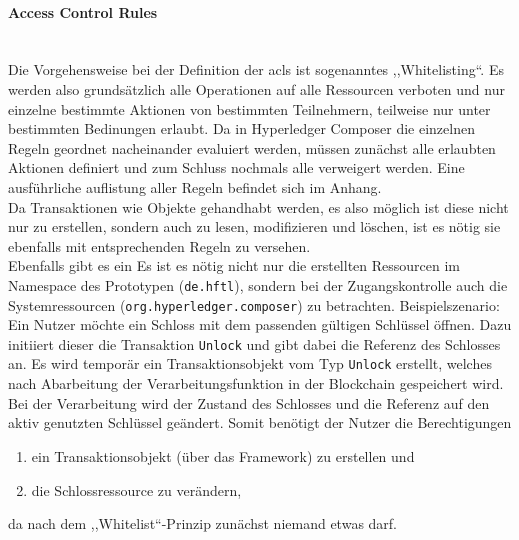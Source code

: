         \paragraph{\textrm{Access Control Rules}}\hspace{0cm}\\
            Die Vorgehensweise bei der Definition der \gls{acl}s ist sogenanntes ,,Whitelisting``. 
            Es werden also grundsätzlich alle Operationen auf alle Ressourcen verboten und nur einzelne bestimmte Aktionen von bestimmten Teilnehmern, teilweise nur unter bestimmten Bedinungen erlaubt. 
            Da in Hyperledger Composer die einzelnen Regeln geordnet nacheinander evaluiert werden, müssen zunächst alle erlaubten Aktionen definiert und zum Schluss nochmals alle verweigert werden. 
            Eine ausführliche auflistung aller Regeln befindet sich im Anhang. \\
            Da Transaktionen wie Objekte gehandhabt werden, es also möglich ist diese nicht nur zu erstellen, sondern auch zu lesen, modifizieren und löschen, ist es nötig sie ebenfalls mit entsprechenden Regeln zu versehen.\\
            Ebenfalls gibt es ein 
            Es ist es nötig nicht nur die erstellten Ressourcen im Namespace des Prototypen (\colorbox{light-gray}{\lstinline{de.hftl}}), sondern bei der Zugangskontrolle auch die Systemressourcen (\colorbox{light-gray}{\lstinline{org.hyperledger.composer}}) zu betrachten.
            \medskip
            Beispielszenario: Ein Nutzer möchte ein Schloss mit dem passenden gültigen Schlüssel öffnen.
            Dazu initiiert dieser die Transaktion \colorbox{light-gray}{\lstinline{Unlock}} und gibt dabei die Referenz des Schlosses an.
            Es wird temporär ein Transaktionsobjekt vom Typ \colorbox{light-gray}{\lstinline{Unlock}} erstellt, welches nach Abarbeitung der Verarbeitungsfunktion in der Blockchain gespeichert wird. 
            Bei der Verarbeitung wird der Zustand des Schlosses und die Referenz auf den aktiv genutzten Schlüssel geändert. 
            Somit benötigt der Nutzer die Berechtigungen
            \begin{enumerate}[noitemsep]
                \item ein Transaktionsobjekt (über das Framework) zu erstellen und
                \item die Schlossressource zu verändern,
            \end{enumerate}
            da nach dem ,,Whitelist``-Prinzip zunächst niemand etwas darf.
